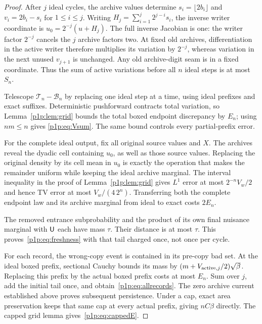 \documentclass[11pt]{article}
\numberwithin{equation}{section}
\theoremstyle{definition}
\theoremstyle{remark}
\begin{document}
\begin{proof}
After $j$ ideal cycles, the archive values determine
$s_i=\lfloor2b_i\rfloor$ and $v_i=2b_i-s_i$ for $1\leq i\leq j$.
Writing $H_j=\sum_{i=1}^j2^{j-i}s_i$, the inverse writer coordinate is
$u_0=2^{-j}(u+H_j)$. The full inverse Jacobian is one: the writer factor
$2^{-j}$ cancels the $j$ archive factors two. At fixed old archives,
differentiation in the active writer therefore multiplies its variation
by $2^{-j}$, whereas variation in the next unused $v_{j+1}$ is unchanged.
Any old archive-digit seam is in a fixed coordinate. Thus the sum of
active variations before all $n$ ideal steps is at most $S_n$.

Telescope $\mathcal T_n-\mathcal B_n$ by replacing one ideal step at a
time, using ideal prefixes and exact suffixes. Deterministic pushforward
contracts total variation, so Lemma~\ref{p1p:lem:grid} bounds the total
boxed endpoint discrepancy by $E_n$; using $nm\leq n$ gives
\eqref{p1p:eq:Vsum}. The same bound controls every partial-prefix error.

For the complete ideal output, fix all original source values and $X$.
The archives reveal the dyadic cell containing $u_0$, as well as those
source values. Replacing the original density by its cell mean in $u_0$
is exactly the operation that makes the remainder uniform while keeping
the ideal archive marginal. The interval inequality in the proof of
Lemma~\ref{p1p:lem:grid} gives $L^1$ error at most $2^{-n}V_w/2$ and hence
TV error at most $V_w/(4\,2^n)$. Transferring both the complete endpoint
law and its archive marginal from ideal to exact costs $2E_n$.

The removed entrance subprobability and the product of its own final
nuisance marginal with $\mathsf U$ each have mass $\tau$. Their distance is
at most $\tau$. This proves~\eqref{p1p:eq:freshness} with that tail charged
once, not once per cycle.

For each record, the wrong-copy event is contained in its pre-copy bad
set. At the ideal boxed prefix, sectional Cauchy bounds its mass by
$(m+V_{{\rm active},j}/2)\sqrt\beta$. Replacing this prefix by the actual
boxed prefix costs at most $E_n$. Sum over $j$, add the initial tail once,
and obtain~\eqref{p1p:eq:allrecords}. The zero archive current established
above proves subsequent persistence. Under a cap, exact area preservation
keeps that same cap at every actual prefix, giving $nC\beta$ directly.
The capped grid lemma gives~\eqref{p1p:eq:cappedE}.
\end{proof}
\end{document}
